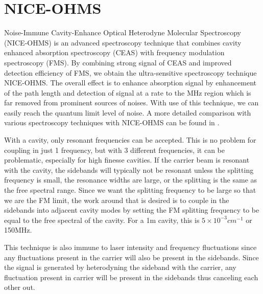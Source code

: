 \documentclass[11pt,a4paper]{book}
\begin{document}
	\section{NICE-OHMS}
		\label{sec:Noise-Immune Cavity-Enhance Optical Heterodyne Molecular Spectroscopy}
		Noise-Immune Cavity-Enhance Optical Heterodyne Molecular Spectroscopy (NICE-OHMS) is an advanced spectroscopy technique that combines cavity enhanced absorption spectroscopy (CEAS) with frequency modulation spectroscopy (FMS). By combining strong signal of CEAS and improved detection efficiency of FMS, we obtain the ultra-sensitive spectroscopy technique NICE-OHMS. The overall effect is to enhance absorption signal by enhancement of the path length and detection of signal at a rate to the MHz region which is far removed from prominent sources of noises. With use of this technique, we can easily reach the quantum limit level of noise. A more detailed comparison with various spectroscopy techniques with NICE-OHMS can be found in \cite{NICE-OHMS}.
		
		With a cavity, only resonant frequencies can be accepted. This is no problem for coupling in just 1 frequency, but with 3 different frequencies, it can be problematic, especially for high finesse cavities.  If the carrier beam is resonant with the cavity, the sidebands will typically not be resonant unless the splitting frequency is small, the resonance widths are large, or the splitting is the same as the free spectral range. Since we want the splitting frequency to be large so that we are the FM limit, the work around that is desired is to couple in the sidebands into adjacent cavity modes by setting the FM splitting frequency to be equal to the free spectral of the cavity. For a 1m cavity, this is $5\times 10^{-3} cm^{-1}$ or 150MHz.
		
		This technique is also immune to laser intensity and frequency fluctuations since any fluctuations present in the carrier will also be present in the sidebands. Since the signal is generated by heterodyning the sideband with the carrier, any fluctuation present in carrier will be present in the sidebands thus canceling each other out.

\end{document}
